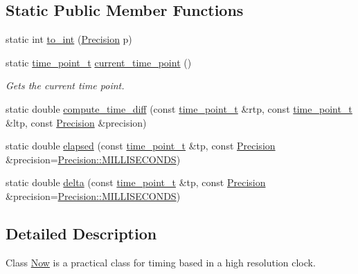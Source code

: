 \subsection*{Static Public Member Functions}
\begin{DoxyCompactItemize}
\item 
static int \hyperlink{class_designar_1_1_now_a24c5b1e6f6d2e7d8030fd4b70a9a1b12}{to\+\_\+int} (\hyperlink{class_designar_1_1_now_a3c9f5e57907c88cbe63c70a64638c072}{Precision} p)
\item 
static \hyperlink{namespace_designar_a0edbd598eadb672df2c70e5af4dfccee}{time\+\_\+point\+\_\+t} \hyperlink{class_designar_1_1_now_af862bb15a2202e02e31a1d11fac08dcf}{current\+\_\+time\+\_\+point} ()
\begin{DoxyCompactList}\small\item\em Gets the current time point. \end{DoxyCompactList}\item 
static double \hyperlink{class_designar_1_1_now_aa140dcc748ca53e2c42548d50273bfaa}{compute\+\_\+time\+\_\+diff} (const \hyperlink{namespace_designar_a0edbd598eadb672df2c70e5af4dfccee}{time\+\_\+point\+\_\+t} \&rtp, const \hyperlink{namespace_designar_a0edbd598eadb672df2c70e5af4dfccee}{time\+\_\+point\+\_\+t} \&ltp, const \hyperlink{class_designar_1_1_now_a3c9f5e57907c88cbe63c70a64638c072}{Precision} \&precision)
\item 
static double \hyperlink{class_designar_1_1_now_a04cc67e3245b662b33b25a6eefe7e957}{elapsed} (const \hyperlink{namespace_designar_a0edbd598eadb672df2c70e5af4dfccee}{time\+\_\+point\+\_\+t} \&tp, const \hyperlink{class_designar_1_1_now_a3c9f5e57907c88cbe63c70a64638c072}{Precision} \&precision=\hyperlink{class_designar_1_1_now_a3c9f5e57907c88cbe63c70a64638c072ab4fd5e5c06e72437a57379576df36936}{Precision\+::\+M\+I\+L\+L\+I\+S\+E\+C\+O\+N\+DS})
\item 
static double \hyperlink{class_designar_1_1_now_a413d1f85c9cc6ac8dde02538bce052f2}{delta} (const \hyperlink{namespace_designar_a0edbd598eadb672df2c70e5af4dfccee}{time\+\_\+point\+\_\+t} \&tp, const \hyperlink{class_designar_1_1_now_a3c9f5e57907c88cbe63c70a64638c072}{Precision} \&precision=\hyperlink{class_designar_1_1_now_a3c9f5e57907c88cbe63c70a64638c072ab4fd5e5c06e72437a57379576df36936}{Precision\+::\+M\+I\+L\+L\+I\+S\+E\+C\+O\+N\+DS})
\end{DoxyCompactItemize}


\subsection{Detailed Description}
Class \hyperlink{class_designar_1_1_now}{Now} is a practical class for timing based in a high resolution clock.

